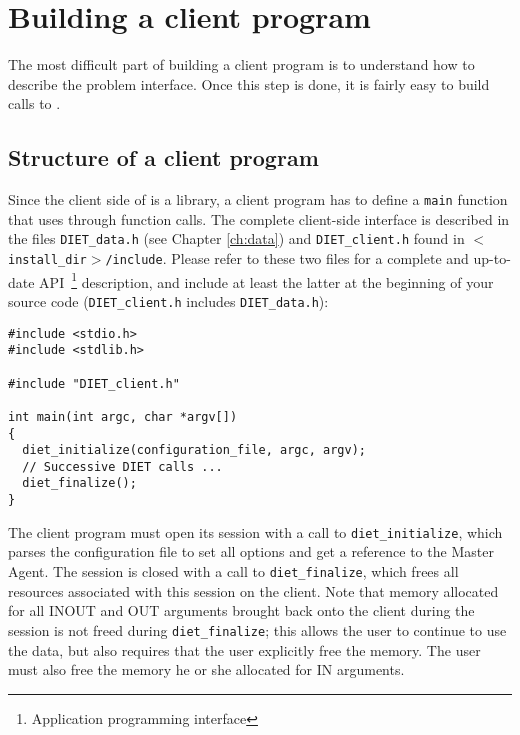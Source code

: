 

\chapter{Building a client program}
\label{ch:client}

The most difficult part of building a client program is to understand how
to describe the problem interface. Once this step is done, it is
fairly easy to build calls to \diet.

\section{Structure of a client program}
\label{sec:cl_struct}

Since the client side of \diet is a library, a client program has to define a
\texttt{main} function that uses \diet through function calls. The complete
client-side interface is described in the files
\texttt{DIET\_data.h} (see Chapter \ref{ch:data}) and
\texttt{DIET\_client.h} found in \texttt{$<$install\_dir$>$/include}.
Please refer to these two files for a complete and
up-to-date API~\footnote{Application programming interface}
description, and include at least the latter at the beginning of
your source code (\texttt{DIET\_client.h} includes \texttt{DIET\_data.h}):
{\footnotesize
\begin{verbatim}
#include <stdio.h>
#include <stdlib.h>

#include "DIET_client.h"

int main(int argc, char *argv[])
{
  diet_initialize(configuration_file, argc, argv);
  // Successive DIET calls ...
  diet_finalize();
}
\end{verbatim}
}

The client program must open its \diet session with a call to
\texttt{diet\_initialize}, which parses the configuration file to set
all options and get a reference to the \diet Master Agent. The session
is closed with a call to \texttt{diet\_finalize}, which frees all
resources associated with this session on the client. Note that
memory allocated for all INOUT and OUT arguments brought back onto
the client during the session is not freed during
\texttt{diet\_finalize}; this allows the user to continue to use the
data, but also requires that the user explicitly free the memory.
The user must also free the memory he or she allocated for IN
arguments.

